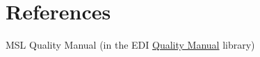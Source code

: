 \section{References}

\begingroup
\renewcommand{\section}[2]{}%

\begin{thebibliography}{99}
 MSL Quality Manual (in the EDI \href{https://edi.callaghaninnovation.govt.nz/ws/msl/QMS/QM?Web=1}{Quality Manual} library)

\end{thebibliography}
\endgroup